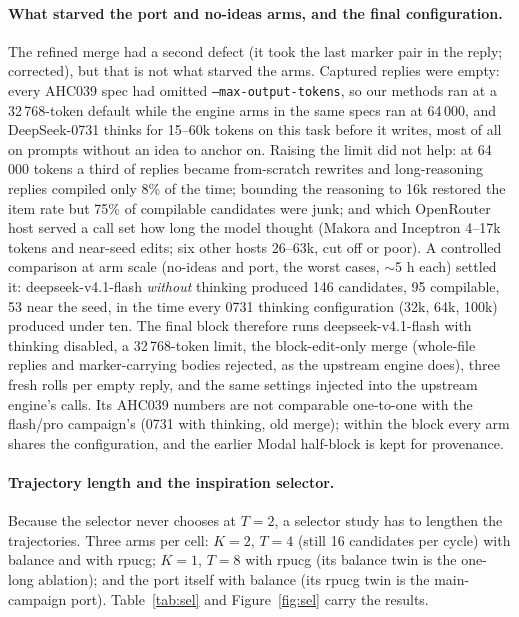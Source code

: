 \label{sec:merge}
\paragraph{What starved the port and no-ideas arms, and the final configuration.} The refined merge
had a second defect (it took the last marker pair in the reply; corrected), but that is not what
starved the arms. Captured replies were empty: every AHC039 spec had omitted
\texttt{--max-output-tokens}, so our methods ran at a 32\,768-token default while the engine arms in
the same specs ran at 64\,000, and DeepSeek-0731 thinks for 15--60k tokens on this task before it
writes, most of all on prompts without an idea to anchor on. Raising the limit did not help: at
64\,000 tokens a third of replies became from-scratch rewrites and long-reasoning replies compiled
only 8\% of the time; bounding the reasoning to 16k restored the item rate but 75\% of compilable
candidates were junk; and which OpenRouter host served a call set how long the model thought
(Makora and Inceptron 4--17k tokens and near-seed edits; six other hosts 26--63k, cut off or poor).
A controlled comparison at arm scale (no-ideas and port, the worst cases, $\sim$5 h each) settled it:
deepseek-v4.1-flash \emph{without} thinking produced 146 candidates, 95 compilable, 53 near the seed,
in the time every 0731 thinking configuration (32k, 64k, 100k) produced under ten. The final block
therefore runs deepseek-v4.1-flash with thinking disabled, a 32\,768-token limit, the block-edit-only
merge (whole-file replies and marker-carrying bodies rejected, as the upstream engine does), three
fresh rolls per empty reply, and the same settings injected into the upstream engine's calls. Its
AHC039 numbers are not comparable one-to-one with the flash/pro campaign's (0731 with thinking, old
merge); within the block every arm shares the configuration, and the earlier Modal half-block is
kept for provenance.

\paragraph{Trajectory length and the inspiration selector.} Because the selector never chooses at
$T{=}2$, a selector study has to lengthen the trajectories. Three arms per cell: $K{=}2$, $T{=}4$
(still 16 candidates per cycle) with balance and with rpucg; $K{=}1$, $T{=}8$ with rpucg (its
balance twin is the one-long ablation); and the port itself with balance (its rpucg twin is the
main-campaign port). Table~\ref{tab:sel} and Figure~\ref{fig:sel} carry the results.

